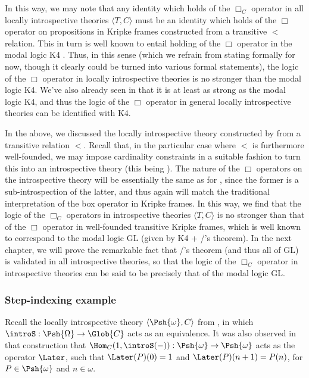 In this way, we may note that any identity which holds of the $\Box_C$ operator in all locally introspective theories $\langle T, C \rangle$ must be an identity which holds of the $\Box$ operator on propositions in Kripke frames constructed from a transitive $<$ relation. This in turn is well known to entail holding of the $\Box$ operator in the modal logic K4 . Thus, in this sense (which we refrain from stating formally for now, though it clearly could be turned into various formal statements), the logic of the $\Box$ operator in locally introspective theories is no stronger than the modal logic K4. We've also already seen in  that it is at least as strong as the modal logic K4, and thus the logic of the $\Box$ operator in general locally introspective theories can be identified with K4.

In the above, we discussed the locally introspective theory constructed by  from a transitive relation $<$. Recall that, in the particular case where $<$ is furthermore well-founded, we may impose cardinality constraints in a suitable fashion to turn this into an introspective theory (this being ). The nature of the $\Box$ operators on the introspective theory  will be essentially the same as for , since the former is a sub-introspection of the latter, and thus again will match the traditional interpretation of the box operator in Kripke frames. In this way, we find that the logic of the $\Box_C$ operators in introspective theories $\langle T, C \rangle$ is no stronger than that of the $\Box$ operator in well-founded transitive Kripke frames, which is well known to correspond to the modal logic GL (given by K4 + \Loeb/'s theorem). In the next chapter, we will prove the remarkable fact that \Loeb/'s theorem (and thus all of GL) is validated in all introspective theories, so that the logic of the $\Box_C$ operator in introspective theories can be said to be precisely that of the modal logic GL.

\subsubsection{Step-indexing example}\label{StepIndexingModal}
Recall the locally introspective theory $\langle \Psh{\omega}, C \rangle$ from , in which $\introS : \Psh{\Omega} \to \Glob{C}$ acts as an equivalence. It was also observed in that construction that $\Hom_C(1, \introS(-)) : \Psh{\omega} \to \Psh{\omega}$ acts as the operator $\Later$, such that $\Later(P)(0) = 1$ and $\Later(P)(n + 1) = P(n)$, for $P \in \Psh{\omega}$ and $n \in \omega$.

